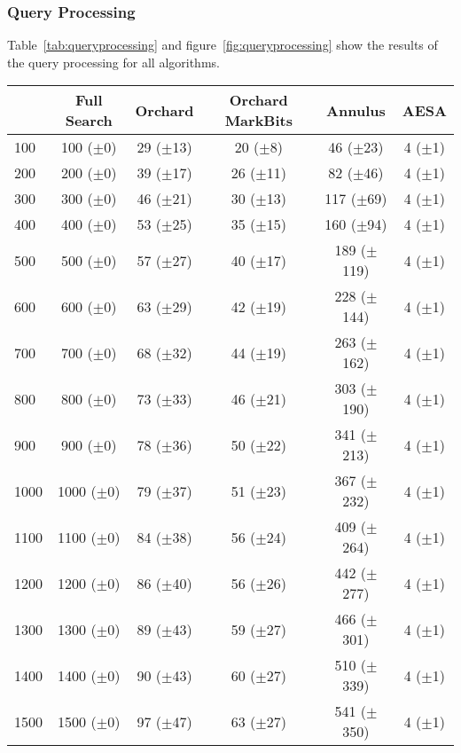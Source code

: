 \documentclass[runningheads,a4paper]{llncs}
\begin{document}
\subsubsection{Query Processing}

Table~\ref{tab:queryprocessing} and figure~\ref{fig:queryprocessing} show the results of the query
processing for all algorithms.

\begin{table}[H]
	\begin{center}{\tiny
		\begin{tabular}{| l | c | c | c | c | c |}
			\hline
		  	& Full Search & Orchard & Orchard MarkBits & Annulus & AESA \\ \hline
		  	100 & 100 ($\pm$0) & 29 ($\pm$13) & 20 ($\pm$8) & 46 ($\pm$23) & 4 ($\pm$1) \\ \hline
			200 & 200 ($\pm$0) & 39 ($\pm$17) & 26 ($\pm$11) & 82 ($\pm$46) & 4 ($\pm$1) \\ \hline
			300 & 300 ($\pm$0) & 46 ($\pm$21) & 30 ($\pm$13) & 117 ($\pm$69) & 4 ($\pm$1) \\ \hline
			400 & 400 ($\pm$0) & 53 ($\pm$25) & 35 ($\pm$15) & 160 ($\pm$94) & 4 ($\pm$1) \\ \hline
			500 & 500 ($\pm$0) & 57 ($\pm$27) & 40 ($\pm$17) & 189 ($\pm$119) & 4 ($\pm$1) \\ \hline
			600 & 600 ($\pm$0) & 63 ($\pm$29) & 42 ($\pm$19) & 228 ($\pm$144) & 4 ($\pm$1) \\ \hline
			700 & 700 ($\pm$0) & 68 ($\pm$32) & 44 ($\pm$19) & 263 ($\pm$162) & 4 ($\pm$1) \\ \hline
			800 & 800 ($\pm$0) & 73 ($\pm$33) & 46 ($\pm$21) & 303 ($\pm$190) & 4 ($\pm$1) \\ \hline
			900 & 900 ($\pm$0) & 78 ($\pm$36) & 50 ($\pm$22) & 341 ($\pm$213) & 4 ($\pm$1) \\ \hline
			1000 & 1000 ($\pm$0) & 79 ($\pm$37) & 51 ($\pm$23) & 367 ($\pm$232) & 4 ($\pm$1) \\ \hline
			1100 & 1100 ($\pm$0) & 84 ($\pm$38) & 56 ($\pm$24) & 409 ($\pm$264) & 4 ($\pm$1) \\ \hline
			1200 & 1200 ($\pm$0) & 86 ($\pm$40) & 56 ($\pm$26) & 442 ($\pm$277) & 4 ($\pm$1) \\ \hline
			1300 & 1300 ($\pm$0) & 89 ($\pm$43) & 59 ($\pm$27) & 466 ($\pm$301) & 4 ($\pm$1) \\ \hline
			1400 & 1400 ($\pm$0) & 90 ($\pm$43) & 60 ($\pm$27) & 510 ($\pm$339) & 4 ($\pm$1) \\ \hline
			1500 & 1500 ($\pm$0) & 97 ($\pm$47) & 63 ($\pm$27) & 541 ($\pm$350) & 4 ($\pm$1) \\ \hline

\end{tabular}}
\end{center}
\end{table}
\end{document}
